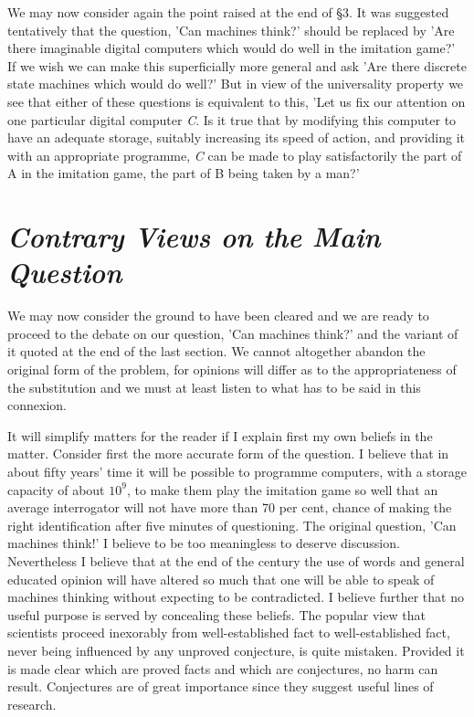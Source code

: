 \documentclass[12pt]{article}
\begin{document}
    We may now consider again the point raised at the end of \S 3. It was suggested tentatively that the question, 'Can machines think?' should be replaced by 'Are there imaginable digital computers which would do well in the imitation game?' If we wish we can make this superficially more general and ask 'Are there discrete state machines which would do well?' But in view of the universality property we see that either of these questions is equivalent to this, 'Let us fix our attention on one particular digital computer \textit{C}. Is it true that by modifying this computer to have an adequate storage, suitably increasing its speed of action, and providing it with an appropriate programme, \textit{C} can be made to play satisfactorily the part of A in the imitation game, the part of B being taken by a man?'

    \section{\textit{Contrary Views on the Main Question}}
    We may now consider the ground to have been cleared and we are ready to proceed to the debate on our question, 'Can machines think?' and the variant of it quoted at the end of the last section. We cannot altogether abandon the original form of the problem, for opinions will differ as to the appropriateness of the substitution and we must at least listen to what has to be said in this connexion.

    It will simplify matters for the reader if I explain first my own beliefs in the matter. Consider first the more accurate form of the question. I believe that in about fifty years' time it will be possible to programme computers, with a storage capacity of about $10^9$, to make them play the imitation game so well that an average interrogator will not have more than 70 per cent, chance of making the right identification after five minutes of questioning. The original question, 'Can machines think!' I believe to be too meaningless to deserve discussion. Nevertheless I believe that at the end of the century the use of words and general educated opinion will have altered so much that one will be able to speak of machines thinking without expecting to be contradicted. I believe further that no useful purpose is served by concealing these beliefs. The popular view that scientists proceed inexorably from well-established fact to well-established fact, never being influenced by any unproved conjecture, is quite mistaken. Provided it is made clear which are proved facts and which are conjectures, no harm can result. Conjectures are of great importance since they suggest useful lines of research.
\end{document}
